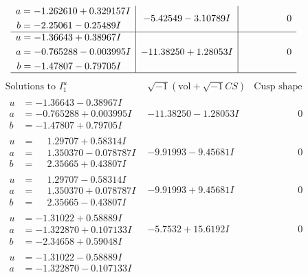 \documentclass[1p]{elsarticle_modified}
\theoremstyle{definition}
\newcommand{\I}{\sqrt{-1}}
\begin{document}
$$\begin{array}{c|c|c}
\begin{aligned}
a &= -1.262610 + 0.329157 I \\
b &= -2.25061 - 0.25489 I\end{aligned}
 & -5.42549 - 3.10789 I & \phantom{-0.000000 } 0 \\ \hline\begin{aligned}
u &= -1.36643 + 0.38967 I \\
a &= -0.765288 - 0.003995 I \\
b &= -1.47807 - 0.79705 I\end{aligned}
 & -11.38250 + 1.28053 I & \phantom{-0.000000 } 0\\
 \hline 
 \end{array}$$\newpage$$\begin{array}{c|c|c}  
\text{Solutions to }I^u_{1}& \I (\text{vol} + \sqrt{-1}CS) & \text{Cusp shape}\\
 \hline 
\begin{aligned}
u &= -1.36643 - 0.38967 I \\
a &= -0.765288 + 0.003995 I \\
b &= -1.47807 + 0.79705 I\end{aligned}
 & -11.38250 - 1.28053 I & \phantom{-0.000000 } 0 \\ \hline\begin{aligned}
u &= \phantom{-}1.29707 + 0.58314 I \\
a &= \phantom{-}1.350370 - 0.078787 I \\
b &= \phantom{-}2.35665 + 0.43807 I\end{aligned}
 & -9.91993 - 9.45681 I & \phantom{-0.000000 } 0 \\ \hline\begin{aligned}
u &= \phantom{-}1.29707 - 0.58314 I \\
a &= \phantom{-}1.350370 + 0.078787 I \\
b &= \phantom{-}2.35665 - 0.43807 I\end{aligned}
 & -9.91993 + 9.45681 I & \phantom{-0.000000 } 0 \\ \hline\begin{aligned}
u &= -1.31022 + 0.58889 I \\
a &= -1.322870 + 0.107133 I \\
b &= -2.34658 + 0.59048 I\end{aligned}
 & -5.7532 + 15.6192 I & \phantom{-0.000000 } 0 \\ \hline\begin{aligned}
u &= -1.31022 - 0.58889 I \\
a &= -1.322870 - 0.107133 I \\

\end{aligned}
\end{array}$$
\end{document}

